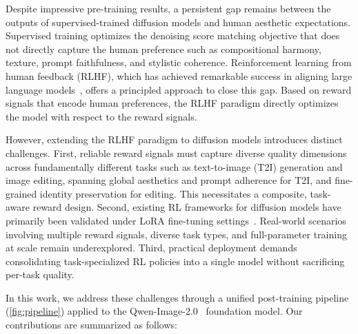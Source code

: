 \documentclass{llmxive}
\begin{document}
Despite impressive pre-training results, a persistent gap remains between the outputs of supervised-trained diffusion models and human aesthetic expectations. Supervised training optimizes the denoising score matching objective that does not directly capture the human preference such as compositional harmony, texture, prompt faithfulness, and stylistic coherence. Reinforcement learning from human feedback (RLHF), which has achieved remarkable success in aligning large language models~\citep{shao2024deepseekmath}, offers a principled approach to close this gap. Based on reward signals that encode human preferences, the RLHF paradigm directly optimizes the model with respect to the reward signals.

However, extending the RLHF paradigm to diffusion models introduces distinct challenges. First, reliable reward signals must capture diverse quality dimensions across fundamentally different tasks such as text-to-image (T2I) generation and image editing, spanning global aesthetics and prompt adherence for T2I, and fine-grained identity preservation for editing. This necessitates a composite, task-aware reward design. Second, existing RL frameworks for diffusion models have primarily been validated under LoRA fine-tuning settings~\citep{liu2025flowgrpo,zheng2025diffusionnft,wang2025grpo}. Real-world scenarios involving multiple reward signals, diverse task types, and full-parameter training at scale remain underexplored. Third, practical deployment demands consolidating task-specialized RL policies into a single model without sacrificing per-task quality.


In this work, we address these challenges through a unified post-training pipeline (\cref{fig:pipeline}) applied to the Qwen-Image-2.0~\citep{zhao2026qwen} foundation model. Our contributions are summarized as follows:
\end{document}
